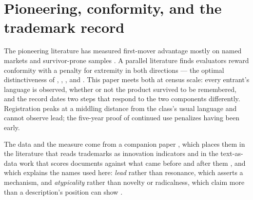 \section{Pioneering, conformity, and the trademark record}\label{sec:related}

The pioneering literature has measured first-mover advantage mostly on
named markets and survivor-prone samples \citep{GolderTellis1993,
SemadeniAnderson2010}. A parallel literature finds evaluators reward
conformity with a penalty for extremity in both directions --- the
optimal distinctiveness of \citet{Zuckerman1999}, \citet{Hsu2006},
\citet{Zhao2017}, and \citet{TaeuscherRothe2020}. This paper meets both
at census scale: every entrant's language is observed, whether or not
the product survived to be remembered, and the record dates two steps
that respond to the two components differently. Registration peaks at a
middling distance from the class's usual language and cannot observe
lead; the five-year proof of continued use penalizes having been early.

The data and the measure come from a companion paper
\citep{SilverCorpus2026}, which places them in the literature that reads
trademarks as innovation indicators \citep{Castaldi2020, Flikkema2019,
Dinlersoz2018} and in the text-as-data work that scores documents
against what came before and after them \citep{Murdock2017,
Barron2018}, and which explains the names used here: \emph{lead} rather
than resonance, which asserts a mechanism, and \emph{atypicality}
rather than novelty or radicalness, which claim more than a
description's position can show \citep{Verhoeven2025}.
\label{sec:nomenclature}
